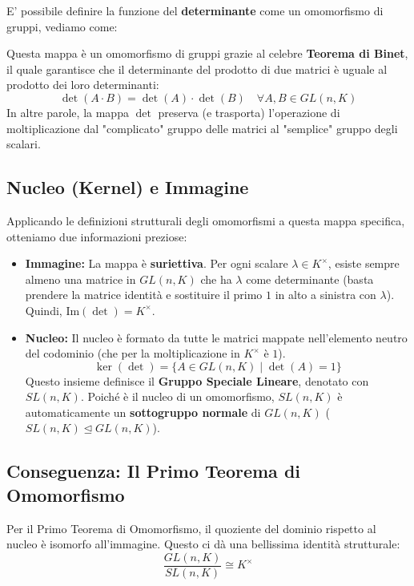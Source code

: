E' possibile definire la funzione del \textbf{determinante} come un omomorfismo di gruppi, vediamo come:

Questa mappa è un omomorfismo di gruppi grazie al celebre \textbf{Teorema di Binet}, il quale garantisce che il determinante del prodotto di due matrici è uguale al prodotto dei loro determinanti:
$$ \det(A \cdot B) = \det(A) \cdot \det(B) \quad \forall A, B \in GL(n, K) $$
In altre parole, la mappa $\det$ preserva (e trasporta) l'operazione di moltiplicazione dal "complicato" gruppo delle matrici al "semplice" gruppo degli scalari.

\subsection*{Nucleo (Kernel) e Immagine}
Applicando le definizioni strutturali degli omomorfismi a questa mappa specifica, otteniamo due informazioni preziose:

\begin{itemize}
    \item \textbf{Immagine:} La mappa è \textbf{suriettiva}. Per ogni scalare $\lambda \in K^\times$, esiste sempre almeno una matrice in $GL(n, K)$ che ha $\lambda$ come determinante (basta prendere la matrice identità e sostituire il primo $1$ in alto a sinistra con $\lambda$). Quindi, $\text{Im}(\det) = K^\times$.
    
    \item \textbf{Nucleo:} Il nucleo è formato da tutte le matrici mappate nell'elemento neutro del codominio (che per la moltiplicazione in $K^\times$ è $1$).
    $$ \ker(\det) = \{ A \in GL(n, K) \mid \det(A) = 1 \} $$
    Questo insieme definisce il \textbf{Gruppo Speciale Lineare}, denotato con $SL(n, K)$. Poiché è il nucleo di un omomorfismo, $SL(n, K)$ è automaticamente un \textbf{sottogruppo normale} di $GL(n, K)$ ($SL(n, K) \trianglelefteq GL(n, K)$).
\end{itemize}

\subsection*{Conseguenza: Il Primo Teorema di Omomorfismo}
Per il Primo Teorema di Omomorfismo, il quoziente del dominio rispetto al nucleo è isomorfo all'immagine. Questo ci dà una bellissima identità strutturale:
$$ \frac{GL(n, K)}{SL(n, K)} \cong K^\times $$

